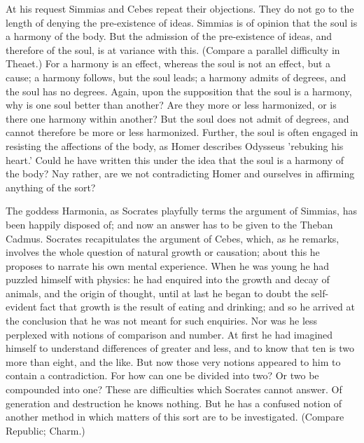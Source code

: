 At his request Simmias and Cebes repeat their objections. They do not
go to the length of denying the pre-existence of ideas. Simmias is of
opinion that the soul is a harmony of the body. But the admission of the
pre-existence of ideas, and therefore of the soul, is at variance with
this. (Compare a parallel difficulty in Theaet.) For a harmony is
an effect, whereas the soul is not an effect, but a cause; a harmony
follows, but the soul leads; a harmony admits of degrees, and the soul
has no degrees. Again, upon the supposition that the soul is a harmony,
why is one soul better than another? Are they more or less harmonized,
or is there one harmony within another? But the soul does not admit of
degrees, and cannot therefore be more or less harmonized. Further, the
soul is often engaged in resisting the affections of the body, as Homer
describes Odysseus 'rebuking his heart.' Could he have written this
under the idea that the soul is a harmony of the body? Nay rather, are
we not contradicting Homer and ourselves in affirming anything of the
sort?

The goddess Harmonia, as Socrates playfully terms the argument of
Simmias, has been happily disposed of; and now an answer has to be given
to the Theban Cadmus. Socrates recapitulates the argument of Cebes,
which, as he remarks, involves the whole question of natural growth or
causation; about this he proposes to narrate his own mental experience.
When he was young he had puzzled himself with physics: he had enquired
into the growth and decay of animals, and the origin of thought, until
at last he began to doubt the self-evident fact that growth is the
result of eating and drinking; and so he arrived at the conclusion that
he was not meant for such enquiries. Nor was he less perplexed with
notions of comparison and number. At first he had imagined himself to
understand differences of greater and less, and to know that ten is two
more than eight, and the like. But now those very notions appeared to
him to contain a contradiction. For how can one be divided into two? Or
two be compounded into one? These are difficulties which Socrates cannot
answer. Of generation and destruction he knows nothing. But he has a
confused notion of another method in which matters of this sort are to
be investigated. (Compare Republic; Charm.)

